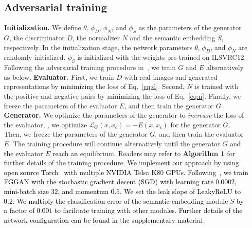 \documentclass[runningheads]{llncs}
\begin{document}
\subsection{Adversarial training}{\flushleft \textbf{Initialization.}} We define $\theta$, $\phi_D$, $\phi_N$, and $\phi_S$ as the parameters of the generator $G$, the discriminator $D$, the normalizer $N$ and the semantic embedding $S$, respectively. In the initialization stage, the network parameters $\theta$, $\phi_D$, and $\phi_N$ are randomly initialized. $\phi_S$ is initialized with the weights pre-trained on ILSVRC12. Following the adversarial training procedure in~\cite{goodfellow2014generative}, we train $G$ and $E$ alternatively as below. 
{\flushleft \textbf{Evaluator.}} First, we train $D$ with real images and generated representations by minimizing the loss of Eq.~\eqref{eq:d}. Second, $N$ is trained with the positive and negative pairs by minimizing the loss of Eq.~\eqref{eq:n}. 
Finally, we freeze the parameters of the evaluator $E$, and then train the generator $G$.
{\flushleft \textbf{Generator.}} We optimize the parameters of the generator to \textit{increase} the loss of the evaluator, \ie, we optimize $\mathcal{L}_G(x,x_c) = -E(x, x_c)$ for the generator $G$.
Then, we freeze the parameters of the generator $G$, and then train the evaluator $E$. The training procedure will continue alternatively until the generator $G$ and the evaluator $E$ reach an equilibrium. Readers may refer to \textbf{Algorithm 1} for further details of the training procedure. 
\textcolor{black}{We implement our approach by using open source Torch~\cite{collobert:2011c} with multiple NVIDIA Telsa K80 GPUs. Following~\cite{radford2015unsupervised}, we train FGGAN with the stochastic gradient decent (SGD) with learning rate $0.0002$, mini-batch size $32$, and momentum $0.5$. We set the leak slope of LeakyReLU to $0.2$.
We multiply the classification error of the semantic embedding module $S$ by a factor of $0.001$ to facilitate training with other modules.
Further details of the network configuration can be found in the supplementary material.}%
\end{document}
